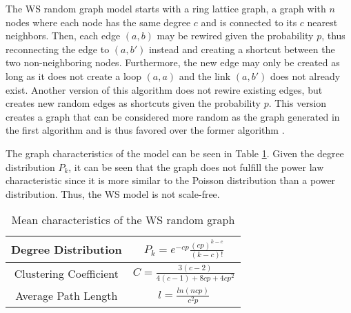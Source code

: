 The WS random graph model starts with a ring lattice graph, a graph 
with $n$ nodes where each node has the same degree $c$ and 
is connected to its $c$ nearest neighbors. Then, each edge $(a, b)$
may be rewired given the probability $p$, thus reconnecting the edge to  $(a, b')$
instead and creating a shortcut between the two non-neighboring nodes.
Furthermore, the new edge may only be created as long as it does not create
a loop $(a, a)$ and the link $(a, b')$ does not already exist.
Another version of this algorithm does not rewire existing edges,
but creates new random edges as shortcuts given the probability $p$.
This version creates a graph that can be considered more 
\glqq random\grqq{} as the graph generated in the first algorithm and is
thus favored over the former algorithm \cite{basicnetwork}.

The graph characteristics of the model can be seen
in Table \ref{ws-model}. Given the degree distribution $P_k$, it can be seen
that the graph does not fulfill the power law characteristic
since it is more similar
to the Poisson distribution than a power distribution. Thus, the WS model
is not scale-free.

\begin{table}[ht!]
    \centering
    \begin{tabular}{|c | c |} 
     \hline
     Degree Distribution & 
     $P_k = e^{-cp}\frac{(cp)^{k-c}}{(k-c)!}$ \\ 
     \hline
     Clustering Coefficient & 
     $C=\frac{3(c-2)}{4(c-1) + 8cp +4cp^2}$ \\ 
     \hline
     Average Path Length & $l = \frac{ln(ncp)}{c^2p}$ \\ 
     \hline
    \end{tabular}
    \caption{Mean characteristics of the WS random graph \cite{basicnetwork}}
    \label{ws-model}
\end{table}




